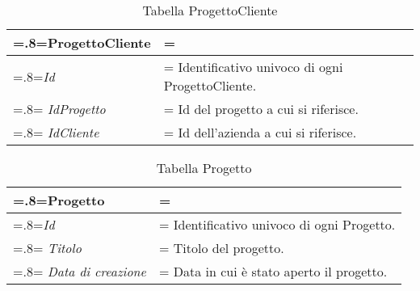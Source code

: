  \begin{table}[H]
                \centering
                \renewcommand{\arraystretch}{1.8}
                \renewcommand\tabularxcolumn[1]{m{#1}}
                \begin{tabularx}{0.9\textwidth} {
                    >{\hsize=.8\hsize\linewidth=\hsize}X
                    >{\hsize=1.2\hsize\linewidth=\hsize}X}
                    \textbf{ProgettoCliente}\\
                    \hline
                    \textit{Id} & Identificativo univoco di ogni ProgettoCliente. \\
                    \hline
                    \textit{IdProgetto} & Id del progetto a cui si riferisce.  \\
                    \hline
                    \textit{IdCliente} & Id dell'azienda a cui si riferisce. \\
                    \hline
                \end{tabularx}
                \smallskip
                \caption{Tabella ProgettoCliente}
            \end{table}
            \smallskip
 \begin{table}[H]
                \centering
                \renewcommand{\arraystretch}{1.8}
                \renewcommand\tabularxcolumn[1]{m{#1}}
                \begin{tabularx}{0.9\textwidth} {
                    >{\hsize=.8\hsize\linewidth=\hsize}X
                    >{\hsize=1.2\hsize\linewidth=\hsize}X}
                    \textbf{Progetto}\\
                    \hline
                    \textit{Id} & Identificativo univoco di ogni Progetto. \\
                    \hline
                    \textit{Titolo} & Titolo del progetto.  \\
                    \hline
                    \textit{Data di creazione} & Data in cui è stato aperto il progetto. \\
                    \hline
                \end{tabularx}
                \smallskip
                \caption{Tabella Progetto}
            \end{table}
            \smallskip

